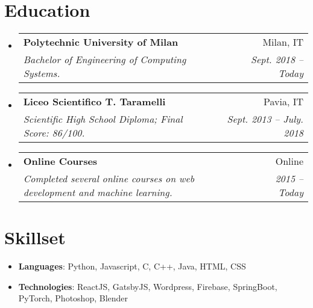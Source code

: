 \documentclass[letterpaper,11pt]{article}
\makeatletter
\newcommand{\resumeItem}[2]{
  \item\small{
    \textbf{#1}{: #2 \vspace{-2pt}}
  }
}
\newcommand{\resumeSubheading}[4]{
  \vspace{-1pt}\item
    \begin{tabular*}{0.97\textwidth}[t]{l@{\extracolsep{\fill}}r}
      \textbf{#1} & #2 \\
      \textit{\small#3} & \textit{\small #4} \\
    \end{tabular*}\vspace{-5pt}
}
\newcommand{\resumeSubItem}[2]{\resumeItem{#1}{#2}\vspace{-4pt}}
\newcommand{\resumeSubHeadingListStart}{\begin{itemize}[leftmargin=*]}
\newcommand{\resumeSubHeadingListEnd}{\end{itemize}}
\makeatother
\begin{document}
\section{Education}
  \resumeSubHeadingListStart
    \resumeSubheading
      {Polytechnic University of Milan}{Milan, IT}
      {Bachelor of Engineering of Computing Systems.}{Sept. 2018 -- Today}
    \resumeSubheading
      {Liceo Scientifico T. Taramelli}{Pavia, IT}
      {Scientific High School Diploma; Final Score: 86/100.}{Sept. 2013 -- July. 2018}
    \resumeSubheading
      {Online Courses}{Online}
      {Completed several online courses on web development and machine learning.}{2015 -- Today}
  \resumeSubHeadingListEnd


\section{Skillset}
  \resumeSubHeadingListStart
   \resumeSubItem {Languages}
      {Python, Javascript, C, C++, Java, HTML, CSS}
   \resumeSubItem {Technologies}
      {ReactJS, GatsbyJS, Wordpress, Firebase, SpringBoot, PyTorch, Photoshop, Blender}
  
  \resumeSubHeadingListEnd


\end{document}
